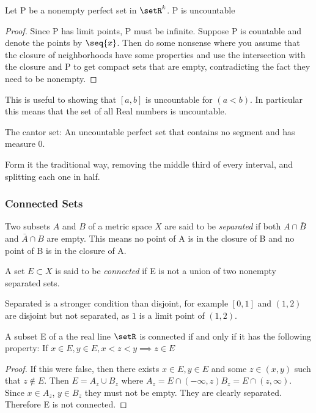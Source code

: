 \documentclass[12pt, letterpaper]{paper}
\begin{document}
\begin{theorem}
  \label{thr:2.43}
  Let P be a nonempty perfect set in $\setR^k$. P is uncountable
\end{theorem}
\begin{proof}
  Since P has limit points, P must be infinite. Suppose P is countable
  and denote the points by $\seq{x}$. Then do some nonsense where you
  assume that the closure of neighborhoods have some properties and
  use the intersection with the closure and P to get compact sets that
  are empty, contradicting the fact they need to be nonempty.
\end{proof}

This is useful to showing that $[a,b]$ is uncountable for $(a<b)$. In
particular this means that the set of all Real numbers is uncountable.

\vspace{ .33in }

The cantor set: An uncountable perfect set that contains no segment
and has measure 0.

Form it the traditional way, removing the middle third of every
interval, and splitting each one in half.

\subsubsection{Connected Sets}
\label{sec:org9d40335}
Two subsets $A$ and $B$ of a metric space $X$ are said to be
\emph{separated} if both $A \cap \bar{B}$ and $\bar{A} \cap B$ are
empty. This means no point of A is in the closure of B and no point of
B is in the closure of A.

A set $E \subset X$ is said to be \emph{connected} if E is not a union of
two nonempty separated sets.

Separated is a stronger condition than disjoint, for example $[0,1]$
and $(1,2)$ are disjoint but not separated, as $1$ is a limit point of
$(1,2)$.

\begin{theorem}
  \label{thr:2.47}
  A subset E of a the real line $\setR$ is connected if and only if it
  has the following property: If
  $x \in E, y\in E, x < z < y \implies z \in E$
\end{theorem}
\begin{proof}
  If this were false, then there exists $x \in E, y \in E$ and some
  $z \in (x,y)$ such that $z \notin E$. Then $E = A_z \cup B_z$ where
  $A_z = E \cap (-\infty,z) B_z = E \cap (z,\infty)$. Since
  $x \in A_z$, $y \in B_z$ they must not be empty. They are clearly
  separated. Therefore E is not connected.
\end{proof}
\end{document}
